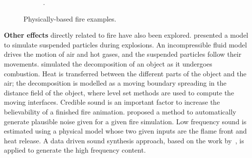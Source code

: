 \begin{figure}[htpb!]
\begin{subfigure}[t]{0.3\textwidth}
                \caption{\cite{Hong:2007}.}
        \end{subfigure} 
        \caption{Physically-based fire examples.}
        \label{fig:physically_based}
\end{figure}
 
\textbf{Other effects} directly related to fire have also been explored.
\cite{Feldman:2003} presented a model to simulate suspended particles during explosions.
An incompressible fluid model drives the motion of air and hot gases, and the suspended particles follow their movements.
\cite{Melek:2005} simulated the decomposition of an object as it undergoes combustion.
Heat is transferred between the different parts of the object and the air; the decomposition is modelled as a moving boundary spreading in the distance field of the object, where level set methods are used to compute the moving interfaces.
Credible sound is an important factor to increase the believability of a finished fire animation.
\cite{Chadwick:2011} proposed a method to automatically generate plausible noise given for a given fire simulation.
Low frequency sound is estimated using a physical model whose two given inputs are the flame front and heat release.
A data driven sound synthesis approach, based on the work by~\cite{Wei:2000}, is applied to generate the high frequency content.

